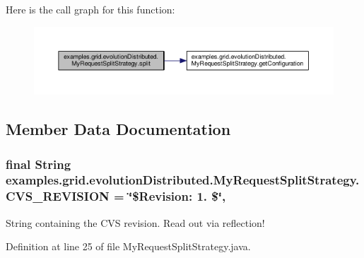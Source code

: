 Here is the call graph for this function\-:
\nopagebreak
\begin{figure}[H]
\begin{center}
\leavevmode
\includegraphics[width=350pt]{classexamples_1_1grid_1_1evolution_distributed_1_1_my_request_split_strategy_a47322c693e0f160e5fc9f9fbf927098d_cgraph}
\end{center}
\end{figure}




\subsection{Member Data Documentation}
\hypertarget{classexamples_1_1grid_1_1evolution_distributed_1_1_my_request_split_strategy_a4539b92a4dbbf06adcff0efa890c7fb9}{
\subsubsection[{C\-V\-S\-\_\-\-R\-E\-V\-I\-S\-I\-O\-N}]{\setlength{\rightskip}{0pt plus 5cm}final String examples.\-grid.\-evolution\-Distributed.\-My\-Request\-Split\-Strategy.\-C\-V\-S\-\_\-\-R\-E\-V\-I\-S\-I\-O\-N = \char`\"{}\$Revision\-: 1. \$\char`\"{}\hspace{0.3cm}{\ttfamily [static]}, {\ttfamily [private]}}}\label{classexamples_1_1grid_1_1evolution_distributed_1_1_my_request_split_strategy_a4539b92a4dbbf06adcff0efa890c7fb9}
String containing the C\-V\-S revision. Read out via reflection! 

Definition at line 25 of file My\-Request\-Split\-Strategy.\-java.

